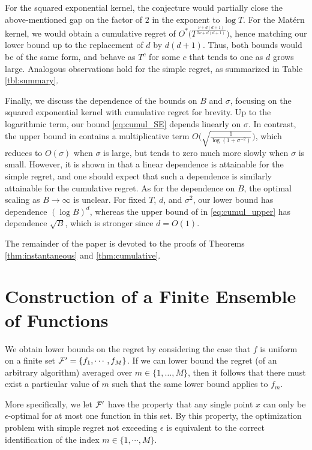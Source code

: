 \documentclass[english,onecolumn,final,11pt]{IEEEtran} %
\begin{document}
For the squared exponential kernel, the conjecture would partially close the above-mentioned gap on the factor of $2$ in the exponent to $\log T$.  For the Mat\'ern kernel, we would obtain a cumulative regret of $O^*\big(  T^{\frac{\nu + d(d+1)}{2\nu + d(d+1)}} \big)$, hence matching our lower bound up to the replacement of $d$ by $d(d+1)$.  Thus, both bounds would be of the same form, and behave as $T^c$ for some $c$ that tends to one as $d$ grows large.  Analogous observations hold for the simple regret, as summarized in Table \ref{tbl:summary}.

Finally, we discuss the dependence of the bounds on $B$ and $\sigma$, focusing on the squared exponential kernel with cumulative regret for brevity.  Up to the logarithmic term, our bound \eqref{eq:cumul_SE} depends linearly on $\sigma$.  In contrast, the upper bound in \cite{Sri09} contains a multiplicative term $O\big( \sqrt{\frac{1}{\log(1+\sigma^{-2})}} \big)$, which reduces to $O(\sigma)$ when $\sigma$ is large, but tends to zero much more slowly when $\sigma$ is small.  However, it is shown in \cite{Bog16a} that a linear dependence is attainable for the simple regret, and one should expect that such a dependence is similarly attainable for the cumulative regret.  As for the dependence on $B$, the optimal scaling as $B \to \infty$ is unclear.  For fixed $T$, $d$, and $\sigma^2$, our lower bound has dependence $(\log B)^d$, whereas the upper bound of in \eqref{eq:cumul_upper} has dependence $\sqrt{B}$, which is stronger since $d = O(1)$.

The remainder of the paper is devoted to the proofs of Theorems \ref{thm:instantaneous} and \ref{thm:cumulative}.

\section{Construction of a Finite Ensemble of Functions}  \label{sec:ensemble}

We obtain lower bounds on the regret by considering the case that $f$ is uniform on a finite set $\mathcal{F}' = \{f_1,\cdots,f_M\}$.  If we can lower bound the regret (of an arbitrary algorithm) averaged over $m \in \{1,\dotsc,M\}$, then it follows that there must exist a particular value of $m$ such that the same lower bound applies to $f_m$.

More specifically, we let $\mathcal{F}'$ have the property that any single point $x$ can only be $\epsilon$-optimal for at most one function in this set.  By this property, the optimization problem with simple regret not exceeding $\epsilon$ is equivalent to the correct identification of the index $m \in \{1,\cdots,M\}$.  
\end{document}
